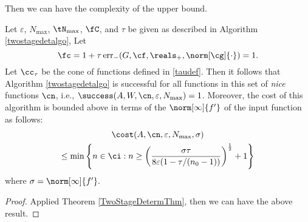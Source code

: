 Then we can have the complexity of the upper bound.
\begin{theorem}   Let  $\varepsilon$, $N_{\max}$, $\tN_{\max}$, $\fC$, and $\tau$ be given as described in Algorithm \ref{twostagedetalgo},  Let
$$
\fc =1 + \tau \err_{-}(G,\cf,\reals_+,\norm[\cg]{\cdot}) =1.
$$
Let $\cc_\tau$ be the cone of functions defined in \eqref{taudef}.
Then it follows that Algorithm \ref{twostagedetalgo} is successful for all functions in this set of \emph{nice} functions $\cn$,  i.e.,  $\success(A,W,\cn,\varepsilon,N_{\max}) = 1$.  Moreover, the cost of this algorithm is bounded above in terms of the $\norm[\infty]{f'}$ of the input function as follows:
\begin{multline}
\cost(A,\cn,\varepsilon,N_{\max},\sigma) \\
\le  \min\left\{ n \in \ci : n \ge \left(\frac{\sigma\tau}{8\varepsilon(1 - \tau/(n_{0}-1))}\right)^{\frac{1}{2}} +1\right\}
\end{multline} where $\sigma=\norm[\infty]{f'}.$
\end{theorem}

\begin{proof}
Applied Theorem \ref{TwoStageDetermThm}, then we can have the above result.
\end{proof}

